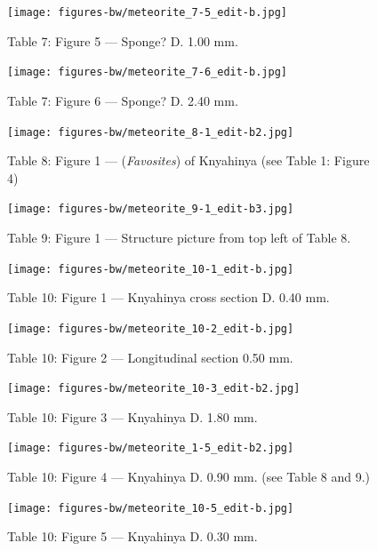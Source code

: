 \documentclass[a4paper, 12pt, oneside]{article}
\begin{document}
\clearpage
\begin{figure}[t]
\texttt{[image: figures-bw/meteorite\_7-5\_edit-b.jpg]}
\caption{Table 7: Figure 5 --- Sponge? D. 1.00 mm.}
\centering
\end{figure}
\clearpage
\begin{figure}[t]
\texttt{[image: figures-bw/meteorite\_7-6\_edit-b.jpg]}
\caption{Table 7: Figure 6 --- Sponge? D. 2.40 mm.}
\centering
\end{figure}
\clearpage
{}
\begin{figure}[t]
\texttt{[image: figures-bw/meteorite\_8-1\_edit-b2.jpg]}
\caption{Table 8: Figure 1 --- (\emph{Favosites}) of Knyahinya (see Table 1: Figure 4)}
\centering
\end{figure}
\clearpage
{}
\begin{figure}[t]
\texttt{[image: figures-bw/meteorite\_9-1\_edit-b3.jpg]}
\caption{Table 9: Figure 1 --- Structure picture from top left of Table 8.}
\centering
\end{figure}
\clearpage
{}
\begin{figure}[t]
\texttt{[image: figures-bw/meteorite\_10-1\_edit-b.jpg]}
\caption{Table 10: Figure 1 --- Knyahinya cross section D. 0.40 mm.}
\centering
\end{figure}
\clearpage
\begin{figure}[t]
\texttt{[image: figures-bw/meteorite\_10-2\_edit-b.jpg]}
\caption{Table 10: Figure 2 --- Longitudinal section 0.50 mm.}
\centering
\end{figure}
\clearpage
\begin{figure}[t]
\texttt{[image: figures-bw/meteorite\_10-3\_edit-b2.jpg]}
\caption{Table 10: Figure 3 --- Knyahinya D. 1.80 mm.}
\centering
\end{figure}
\clearpage
\begin{figure}[t]
\texttt{[image: figures-bw/meteorite\_1-5\_edit-b2.jpg]}
\caption{Table 10: Figure 4 --- Knyahinya D. 0.90 mm. (see Table 8 and 9.)}
\centering
\end{figure}
\clearpage
\begin{figure}[t]
\texttt{[image: figures-bw/meteorite\_10-5\_edit-b.jpg]}
\caption{Table 10: Figure 5 --- Knyahinya D. 0.30 mm.}
\centering
\end{figure}
\end{document}
